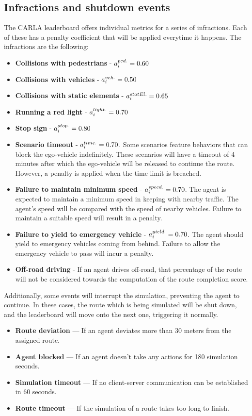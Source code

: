 \documentclass{article}
\begin{document}
\subsection{Infractions and shutdown events}
The CARLA leaderboard offers individual metrics for a series of infractions. Each of these has a penalty coefficient that will be applied everytime it happens. 
The infractions are the following:
\begin{itemize}
    \item \textbf{Collisions with pedestrians} - $a_{\small{i}}^{\small{ped.}} = 0.60$
    \item \textbf{Collisions with vehicles} - $a_{\small{i}}^{\small{veh.}} = 0.50$
    \item \textbf{Collisions with static elements} - $a_{\small{i}}^{\small{statEl.}} = 0.65$
    \item \textbf{Running a red light } - $a_{\small{i}}^{\small{light.}} = 0.70$
    \item \textbf{Stop sign} - $a_{\small{i}}^{\small{stop.}} = 0.80$
    \item \textbf{Scenario timeout} - $a_{\small{i}}^{\small{time.}} = 0.70$. Some scenarios feature behaviors that can block the ego-vehicle indefinitely. 
            These scenarios will have a timeout of 4 minutes after which the ego-vehicle will be released to continue the route. However, a penalty is applied when 
            the time limit is breached.
    \item \textbf{Failure to maintain minimum speed} - $a_{\small{i}}^{\small{speed.}} = 0.70$. The agent is expected to maintain a minimum speed in keeping with nearby traffic.
            The agent’s speed will be compared with the speed of nearby vehicles. Failure to maintain a suitable speed will result in a penalty.
    \item \textbf{Failure to yield to emergency vehicle} - $a_{\small{i}}^{\small{yield.}} = 0.70$. The agent should yield to emergency vehicles coming from behind. Failure to allow the emergency vehicle to pass will incur a penalty.
    \item \textbf{Off-road driving} - If an agent drives off-road, that percentage of the route will not be considered towards the computation of the route completion score.
\end{itemize}

Additionally, some events will interrupt the simulation, preventing the agent to continue. In these cases, the route which is being simulated will be shut down, and the 
leaderboard will move onto the next one, triggering it normally.
\begin{itemize}
    \item \textbf{Route deviation} — If an agent deviates more than 30 meters from the assigned route.
    \item \textbf{Agent blocked} — If an agent doesn’t take any actions for 180 simulation seconds.
    \item \textbf{Simulation timeout} — If no client-server communication can be established in 60 seconds.
    \item \textbf{Route timeout} — If the simulation of a route takes too long to finish.
\end{itemize}
\end{document}
